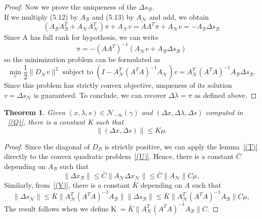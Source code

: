 \documentclass[a4paper,10 pt,titlepage,twoside]{book}
\theoremstyle{plain}
\newtheorem{thm}{Theorem}[chapter]
\theoremstyle{definition}
\theoremstyle{remark}
\begin{document}
\begin{proof}
	 Now we prove the uniqueness of the $\Delta s_{\mathcal{B}}$.\\
	 If we multiply (5.12) by $A_{\mathcal{B}}$ and (5.13) by $A_{\mathcal{N}}$ and add, we obtain
	 \begin{equation*}
	 (A_{\mathcal{B}}A_{\mathcal{B}}^{T}+A_{\mathcal{N}}A_{\mathcal{N}}^{T})\pi+A_{\mathcal{N}}v = AA^{T}\pi+A_{\mathcal{N}}v = -A_{\mathcal{B}}\Delta s_{\mathcal{B}}
	 \end{equation*} 
	 Since A has full rank for hypothesis, we can write
	 \begin{equation*}
	 \pi = -(AA^{T})^{-1}(A_{\mathcal{N}}v +A_{\mathcal{B}}\Delta s_{\mathcal{B}})
	 \end{equation*}
	 so the minimization problem can be formulated as
	 	\begin{equation}\label{(V)}
	 \min\limits_{v}\frac{1}{2}\lVert D_{\mathcal{N}}v\rVert^{2} \text{ subject to }
	 (I-A_{\mathcal{N}}^{T}(A^{T}A)^{-1}A_{\mathcal{N}})v =A_{\mathcal{N}}^{T}(A^{T}A)^{-1}A_{\mathcal{B}}\Delta s_{\mathcal{B}}.		 
	 \end{equation}
	 Since this problem  has strictly convex objective, unqueness of its solution $v=\Delta s_{\mathcal{N}}$ is guaranteed. To conclude, we can recover $\Delta \lambda=\pi$ as defined above. 
\end{proof}
\begin{thm}\label{(Z)}
	Given $(x, \lambda, s)\in\mathcal{N}_{- \infty}(\gamma)$ and $(\Delta x,\Delta \lambda, \Delta s)$ computed in ~\ref{(Q)}, there is a constant K such that
	\begin{equation*}
	\lVert (\Delta x, \Delta s)\rVert \leq K \mu.
	\end{equation*}
\end{thm}
\begin{proof}
	Since the diagonal of $D_{\mathcal{B}}$ is strictly positive, we can apply the lemma~\ref{(T)} directly to the convex quadratic problem~\ref{(U)}. Hence, there is a constant $\bar{C}$ depending on $A_{\mathcal{B}}$ such that
	\begin{equation}
	\lVert \Delta x_{\mathcal{B}}\rVert \leq \bar{C}\lVert A_{\mathcal{N}}\Delta x_{\mathcal{N}}\rVert\leq \bar{C}\lVert A_{\mathcal{N}}\rVert C\mu,
	\end{equation}
	Similarly, from~\ref{(V)}, there is a constant $\bar{K}$ depending on $A$ such that
		\begin{equation}
	\lVert \Delta s_{\mathcal{N}}\rVert \leq \bar{K}\lVert A_{\mathcal{N}}^{T}(A^{T}A)^{-1}A_{\mathcal{B}}\rVert\lVert \Delta s_{\mathcal{B}}\rVert \leq\bar{K} \lVert A_{\mathcal{N}}^{T}(A^{T}A)^{-1}A_{\mathcal{B}}\rVert C\mu,
	\end{equation}
	The result follows when we define K$\;=\bar{K} \lVert A_{\mathcal{N}}^{T}(A^{T}A)^{-1}A_{\mathcal{B}}\rVert C$.
\end{proof}
\end{document}
